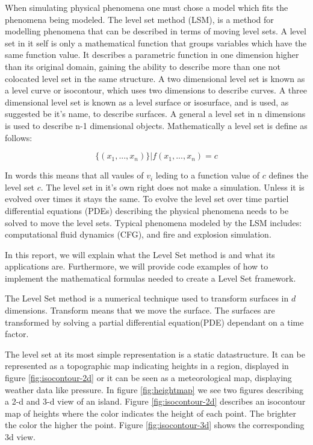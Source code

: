 When simulating physical phenomena one must chose a model which fits
the phenomena being modeled. The level set method (LSM), is a method
for modelling phenomena that can be described in terms of moving
level sets.
%
A level set in it self is only a mathematical function that groups
variables which have the same function value. It describes a
parametric function in one dimension higher than its original domain,
gaining the ability to describe more than one not colocated level set
in the same structure.
%
A two dimensional level set is known as a level curve or
isocontour, which uses two dimensions to describe curves. A three
dimensional level set is known as a level surface or isosurface, and
is used, as suggested be it's name, to describe surfaces.
A general a level set in n dimensions is used to describe n-1
dimensional objects. Mathematically a level set is define as follows:

\begin{equation}
\{ (x_1,...,x_n) \} | f(x_1,...,x_n) = c
\end{equation}

In words this means that all vaules of $v_i$ leding to a function
value of $c$ defines the level set $c$.
%
The level set in it's own right does not make a simulation. Unless it
is evolved over times it stays the same. To evolve the level set over
time partiel differential equations (PDEs) describing the physical
phenomena needs to be solved to move the level sets.
%
Typical phenomena modeled by the LSM includes: computational fluid
dynamics (CFG), and fire and explosion simulation. 

In this report, we will explain what the Level Set method is and what
its applications are. Furthermore, we will provide code examples of
how to implement the mathematical formulas needed to create a Level
Set framework.

The Level Set method is a numerical technique used to transform
surfaces in $d$ dimensions. Transform means that we move the surface. The surfaces are transformed by solving a
partial differential equation(PDE) dependant on a time factor.

The level set at its most simple representation is a static
datastructure. It can be represented as a topographic map indicating
heights in a region, displayed in figure \vref{fig:isocontour-2d} or
it can be seen as a meteorological map, displaying weather data like
pressure. 
In figure \vref{fig:heightmap} we see two figures describing a 2-d and 3-d view of an island. Figure \vref{fig:isocontour-2d} describes an isocontour map of heights where the color indicates the height of each point. The brighter the color the higher the point. Figure \vref{fig:isocontour-3d} shows the corresponding 3d view.  

